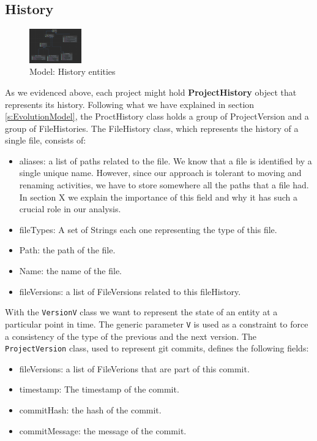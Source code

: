 \subsection*{History}

\begin{figure}
    \center
    \includegraphics[width=0.2\textwidth]{UMLHistory.png}
    \caption{Model: History entities}
    \label{fig:modelHistory}
\end{figure}

As we evidenced above, each project might hold \textbf{ProjectHistory} object that represents its history. 
Following what we have explained in section \ref{s:EvolutionModel}, the ProctHistory class holds a group of ProjectVersion and a group of FileHistories. The FileHistory class, which represents the history of a single file, consists of:
\begin{itemize}
    \item aliases: a list of paths related to the file. We know that a file is identified by a single unique name. However, since our approach is tolerant to moving and renaming activities, we have to store somewhere all the paths that a file had. In section X we explain the importance of this field and why it has such a crucial role in our analysis. 
    \item fileTypes: A set of Strings each one representing the type of this file. 
    \item Path: the path of the file.
    \item Name: the name of the file.
    \item fileVersions: a list of FileVersions related to this fileHistory. 
\end{itemize}
With the \texttt{VersionV} class we want to represent the state of an entity at a particular point in time. 
The generic parameter \texttt{V} is used as a constraint to force a consistency of the type of the previous and the next version. 
The \texttt{ProjectVersion} class, used to represent git commits, defines the following fields: 
\begin{itemize}
    \item fileVersions: a list of FileVerions that are part of this commit.
    \item timestamp: The timestamp of the commit. 
    \item commitHash: the hash of the commit. 
    \item commitMessage: the message of the commit.
\end{itemize}
